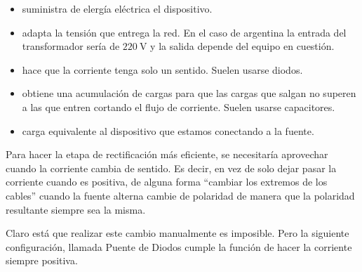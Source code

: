 \documentclass[a5paper,12pt,twoside]{book}
\begin{document}
\begin{itemize}
    \item {} suministra de elergía eléctrica el dispositivo.
    \item {} adapta la tensión que entrega la red. En el caso de argentina la entrada del transformador sería de $\SI{220}{\volt}$ y la salida depende del equipo en cuestión.
    \item {} hace que la corriente tenga solo un sentido. Suelen usarse diodos.
    \item {} obtiene una acumulación de cargas para que las cargas que salgan no superen a las que entren cortando el flujo de corriente. Suelen usarse capacitores.
    \item {} carga equivalente al dispositivo que estamos conectando a la fuente.
\end{itemize}

\begin{center}
    \def\svgwidth{\linewidth}
    
\end{center}


Para hacer la etapa de rectificación más eficiente, se necesitaría aprovechar cuando la corriente cambia de sentido. Es decir, en vez de solo dejar pasar la corriente cuando es positiva, de alguna forma ``cambiar los extremos de los cables'' cuando la fuente alterna cambie de polaridad de manera que la polaridad resultante siempre sea la misma.

\begin{center}
    \def\svgwidth{0.6\linewidth}
    
\end{center}

\begin{center}
    \def\svgwidth{0.6\linewidth}
    
\end{center}

Claro está que realizar este cambio manualmente es imposible. Pero la siguiente configuración, llamada Puente de Diodos cumple la función de hacer la corriente siempre positiva.

\begin{center}
    \def\svgwidth{0.6\linewidth}
    
\end{center}
\end{document}
